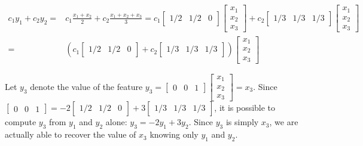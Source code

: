 \documentclass{article}
\begin{document}
\begin{itemize}
\begin{align*}
c_1 y_1 + c_2 y_2 = & c_1 \frac{x_1 + x_2}{2} + c_2 \frac{x_1 + x_2 + x_3}{3} 
= c_1 \begin{bmatrix} 1/2 & 1/2 & 0 \end{bmatrix}\begin{bmatrix} x_1 \\ x_2 \\ x_3 \end{bmatrix} + c_2 \begin{bmatrix} 1/3 & 1/3 & 1/3 \end{bmatrix}\begin{bmatrix} x_1 \\ x_2 \\ x_3 \end{bmatrix} \\
= & (c_1 \begin{bmatrix} 1/2 & 1/2 & 0 \end{bmatrix} + c_2 \begin{bmatrix} 1/3 & 1/3 & 1/3 \end{bmatrix})\begin{bmatrix} x_1 \\ x_2 \\ x_3 \end{bmatrix}
\end{align*}   

Let \(y_3\) denote the value of the feature \(y_3 = \begin{bmatrix} 0 & 0 & 1 \end{bmatrix}\begin{bmatrix} x_1 \\ x_2 \\ x_3 \end{bmatrix} = x_3\). Since \(\begin{bmatrix} 0 & 0 & 1 \end{bmatrix} = -2\begin{bmatrix} 1/2 & 1/2 & 0 \end{bmatrix} + 3\begin{bmatrix} 1/3 & 1/3 & 1/3 \end{bmatrix}\), it is possible to compute \(y_3\) from \(y_1\) and \(y_2\) alone: \(y_3 = -2y_1 + 3y_2\). Since \(y_3\) is simply \(x_3\), we are actually able to recover the value of \(x_3\) knowing only \(y_1\) and \(y_2\). 


\end{itemize}
\end{document}
